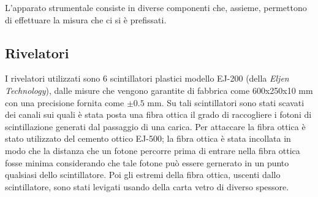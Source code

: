 L'apparato strumentale consiste in diverse componenti che, assieme, permettono di effettuare la misura che ci si è prefissati. 
\subsection{Rivelatori}
I rivelatori utilizzati sono 6 scintillatori plastici modello EJ-200 (della \textit{Eljen Technology}), dalle misure che vengono garantite di fabbrica come
600x250x10 mm con una precisione fornita come $\pm 0.5$ mm. Su tali scintillatori sono stati scavati dei canali sui quali è stata  posta una fibra ottica il grado di raccogliere
i fotoni di scintillazione generati dal passaggio di una carica. Per attaccare la fibra ottica è stato utilizzato del cemento ottico EJ-500; la fibra ottica è stata
incollata in modo che la distanza che un fotone percorre prima di entrare nella fibra ottica fosse minima considerando che tale fotone può essere gernerato in un punto qualsiasi
dello scintillatore. Poi gli estremi della fibra ottica, uscenti dallo scintillatore, sono stati levigati usando della carta vetro di diverso spessore.\\

